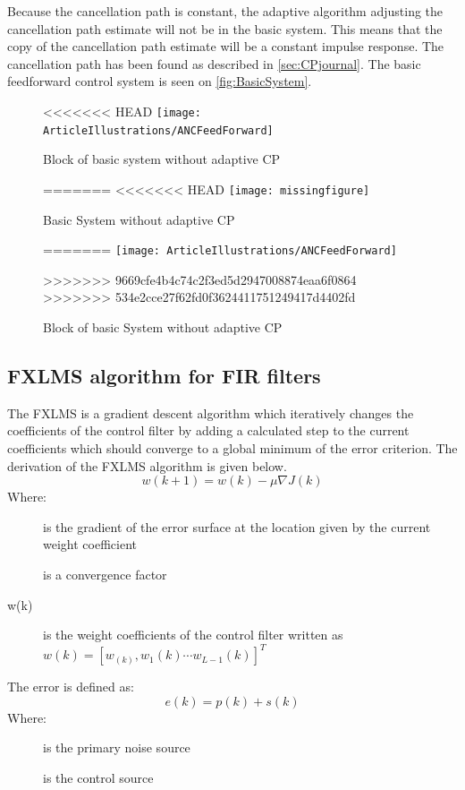 Because the cancellation path is constant, the adaptive algorithm adjusting the cancellation path estimate will not be in the basic system. This means that the copy of the cancellation path estimate will be a constant impulse response. The cancellation path has been found as described in \autoref{sec:CPjournal}. The basic feedforward control system is seen on \autoref{fig:BasicSystem}. 

\begin{figure}[H]
	\centering
<<<<<<< HEAD
	\texttt{[image: ArticleIllustrations/ANCFeedForward]}
	\caption{Block of basic system without adaptive CP}
=======
<<<<<<< HEAD
	\texttt{[image: missingfigure]}
	\caption{Basic System without adaptive CP}
=======
	\texttt{[image: ArticleIllustrations/ANCFeedForward]}
	\caption{Block of basic System without adaptive CP}
>>>>>>> 9669cfe4b4c74c2f3ed5d2947008874eaa6f0864
>>>>>>> 534e2cce27f62fd0f3624411751249417d4402fd
	\label{fig:BasicSystem}
\end{figure}   






\subsection{FXLMS algorithm for FIR filters}\label{subsec:fxlms}
The FXLMS is a gradient descent algorithm which iteratively changes the coefficients of the control filter by adding a calculated step to the current coefficients which should converge to a global minimum of the error criterion. The derivation of the FXLMS algorithm is given below. 
\begin{equation}\label{eq:FXLMSNewCoef}
w(k+1) = w(k) - \mu\nabla J(k)
\end{equation}
Where:
\begin{description}
	\item[] is the gradient of the error surface at the location given by the current weight coefficient
	\item[\text{$\mu$}] is a convergence factor
	\item[w(k)] is the weight coefficients of the control filter written as  $w(k)=[w_(k),w_1(k) \cdots w_{L-1}(k)]^T$
\end{description}
The error is defined as:
\begin{equation}\label{eq:FXLMSError}
e(k) = p(k) + s(k)
\end{equation}
Where:
\begin{description}
	\item[] is the primary noise source
	\item[] is the control source
\end{description}

